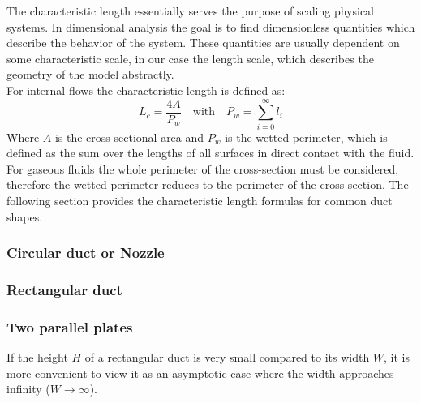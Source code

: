 The characteristic length essentially serves the purpose of scaling physical systems.
In dimensional analysis the goal is to find dimensionless quantities which describe the behavior of the system.
These quantities are usually dependent on some characteristic scale, in our case the length scale, which describes the geometry of the model abstractly.\\
For internal flows the characteristic length is defined as:
$$
	L_c=\frac{4A}{P_w} \quad \text{with} \quad P_w = \sum^{\infty}_{i=0} l_i
$$
Where $A$ is the cross-sectional area and $P_w$ is the wetted perimeter, which is defined as the sum over the lengths of all surfaces in direct contact with the fluid.
For gaseous fluids the whole perimeter of the cross-section must be considered, therefore the wetted perimeter reduces to the perimeter of the cross-section.
The following section provides the characteristic length formulas for common duct shapes. 

\subsubsection*{Circular duct or Nozzle}



\subsubsection*{Rectangular duct}



\subsubsection*{Two parallel plates}

If the height $H$ of a rectangular duct is very small compared to its width $W$, it is more convenient to view it as an asymptotic case where the width approaches infinity ($W \to \infty$).




